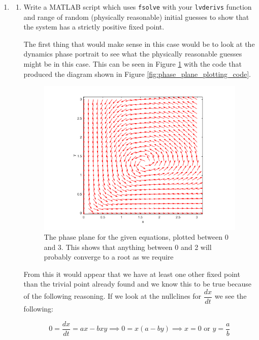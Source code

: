 \documentclass[11pt]{report}
\begin{document}
\begin{enumerate}[label=\alph*)]
\begin{enumerate}[label=\roman*)]
			\end{enumerate} 
		\item
			\begin{enumerate} [label=\roman*)]
				\item Write a MATLAB script which uses \texttt{fsolve} with your \texttt{lvderivs} function and range of random (physically reasonable) initial guesses to show that the system has a strictly positive fixed point. 
				
				The first thing that would make sense in this case would be to look at the dynamics phase portrait to see what the physically reasonable guesses might be in this case. This can be seen in Figure \ref{fig:phase_plane} with the code that produced the diagram shown in Figure \ref{fig:phase_plane_plotting_code}. 
				
				\begin{figure}[h]
					\begin{center}
						\includegraphics[width=5in, clip]{phase_plane.png}
					\end{center}
					\caption{The phase plane for the given equations, plotted between $0$ and $3$. This shows that anything between 0 and 2 will probably converge to a root as we require}
					\label{fig:phase_plane}
				\end{figure}
				
				From this it would appear that we have at least one other fixed point than the trivial point already found and we know this to be true because of the following reasoning. If we look at the nullclines for $\dfrac{dx}{dt}$ we see the following:
				
				$$
				0 = \dfrac{dx}{dt} = ax-bxy \implies 0 = x(a-by) \implies x = 0 \text{ or } y = \dfrac{a}{b}
				$$
				

\end{enumerate}
\end{enumerate}
\end{document}

